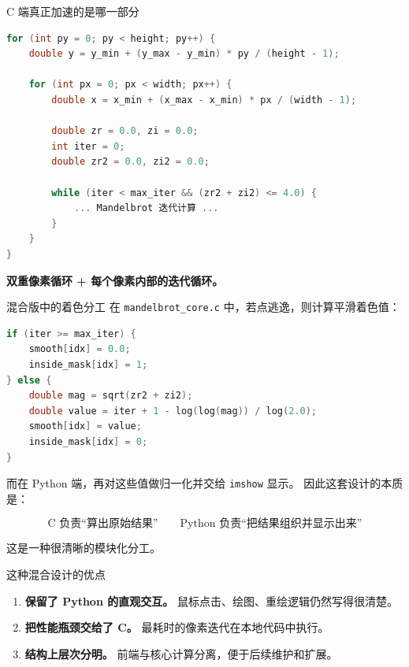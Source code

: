 \documentclass[aspectratio=169,11pt]{ctexbeamer}
\begin{document}
\begin{frame}[fragile]{C 端真正加速的是哪一部分}
\begin{lstlisting}[language=C]
for (int py = 0; py < height; py++) {
    double y = y_min + (y_max - y_min) * py / (height - 1);

    for (int px = 0; px < width; px++) {
        double x = x_min + (x_max - x_min) * px / (width - 1);

        double zr = 0.0, zi = 0.0;
        int iter = 0;
        double zr2 = 0.0, zi2 = 0.0;

        while (iter < max_iter && (zr2 + zi2) <= 4.0) {
            ... Mandelbrot 迭代计算 ...
        }
    }
}
\end{lstlisting}

\textbf{双重像素循环 + 每个像素内部的迭代循环。}  
\end{frame}

\begin{frame}[fragile]{混合版中的着色分工}
在 \texttt{mandelbrot\_core.c} 中，若点逃逸，则计算平滑着色值：

\begin{lstlisting}[language=C]
if (iter >= max_iter) {
    smooth[idx] = 0.0;
    inside_mask[idx] = 1;
} else {
    double mag = sqrt(zr2 + zi2);
    double value = iter + 1 - log(log(mag)) / log(2.0);
    smooth[idx] = value;
    inside_mask[idx] = 0;
}
\end{lstlisting}

而在 Python 端，再对这些值做归一化并交给 \texttt{imshow} 显示。  
因此这套设计的本质是：

\[
\text{C 负责“算出原始结果”}
\qquad
\text{Python 负责“把结果组织并显示出来”}
\]

这是一种很清晰的模块化分工。
\end{frame}

\begin{frame}{这种混合设计的优点}
\begin{enumerate}
  \item \textbf{保留了 Python 的直观交互。}
  鼠标点击、绘图、重绘逻辑仍然写得很清楚。
  \item \textbf{把性能瓶颈交给了 C。}
  最耗时的像素迭代在本地代码中执行。
  \item \textbf{结构上层次分明。}
  前端与核心计算分离，便于后续维护和扩展。
\end{enumerate}
\end{frame}
\end{document}
